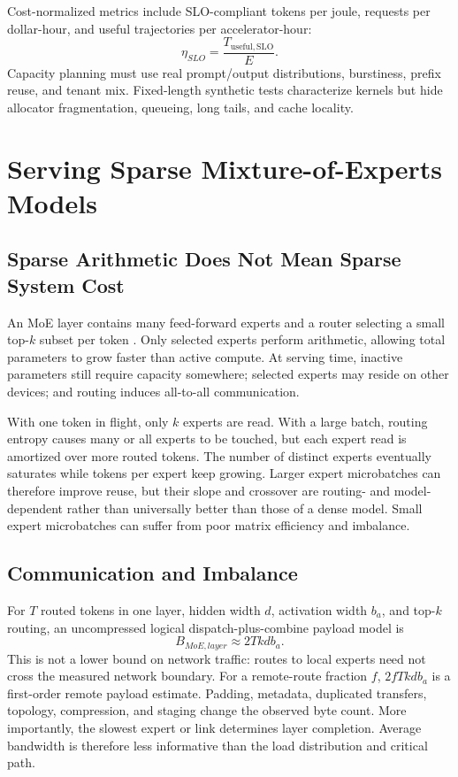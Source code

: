 \documentclass[journal]{IEEEtran}
\begin{document}
Cost-normalized metrics include SLO-compliant tokens per joule, requests per dollar-hour, and useful trajectories per accelerator-hour:
\begin{equation}
\eta_{SLO}=\frac{T_{\mathrm{useful,SLO}}}{E}.
\label{eq:slo-efficiency}
\end{equation}
Capacity planning must use real prompt/output distributions, burstiness, prefix reuse, and tenant mix. Fixed-length synthetic tests characterize kernels but hide allocator fragmentation, queueing, long tails, and cache locality.

\section{Serving Sparse Mixture-of-Experts Models}
\subsection{Sparse Arithmetic Does Not Mean Sparse System Cost}
An MoE layer contains many feed-forward experts and a router selecting a small top-$k$ subset per token \cite{shazeer2017moe,lepikhin2021gshard,fedus2022switch}. Only selected experts perform arithmetic, allowing total parameters to grow faster than active compute. At serving time, inactive parameters still require capacity somewhere; selected experts may reside on other devices; and routing induces all-to-all communication.

With one token in flight, only $k$ experts are read. With a large batch, routing entropy causes many or all experts to be touched, but each expert read is amortized over more routed tokens. The number of distinct experts eventually saturates while tokens per expert keep growing. Larger expert microbatches can therefore improve reuse, but their slope and crossover are routing- and model-dependent rather than universally better than those of a dense model. Small expert microbatches can suffer from poor matrix efficiency and imbalance.

\subsection{Communication and Imbalance}
For $T$ routed tokens in one layer, hidden width $d$, activation width $b_a$, and top-$k$ routing, an uncompressed logical dispatch-plus-combine payload model is
\begin{equation}
B_{MoE,layer}\approx 2Tkd b_a.
\label{eq:moe-bytes}
\end{equation}
This is not a lower bound on network traffic: routes to local experts need not cross the measured network boundary. For a remote-route fraction $f$, $2fTkd b_a$ is a first-order remote payload estimate. Padding, metadata, duplicated transfers, topology, compression, and staging change the observed byte count. More importantly, the slowest expert or link determines layer completion. Average bandwidth is therefore less informative than the load distribution and critical path.
\end{document}
